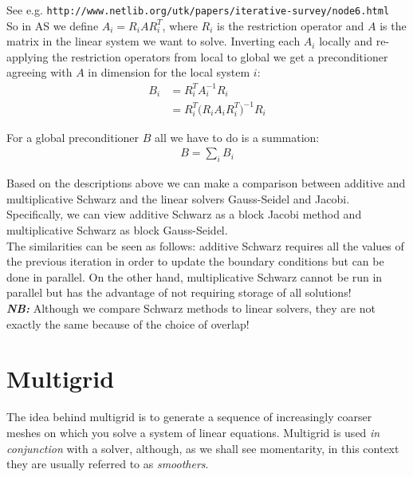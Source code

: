 See e.g. \texttt{http://www.netlib.org/utk/papers/iterative-survey/node6.html}\\

So in AS we define $A_i = R_i A R_i^T$, where $R_i$ is the restriction operator
and $A$ is the matrix in the linear system we want to solve. Inverting each $A_i$
locally and re-applying the restriction operators from local to global we get a
preconditioner agreeing with $A$ in dimension for the local system $i$:
\begin{align*}
B_i & = R_i^T A_i^{-1} R_i\\
    & = R_i^T \big(R_i A_i R_i^T \big)^{-1} R_i
\end{align*}

For a global preconditioner $B$ all we have to do is a summation:
\begin{align*}
B = \sum_i B_i
\end{align*}

\begin{remark}
Based on the descriptions above we can make a comparison between additive and multiplicative Schwarz and
the linear solvers Gauss-Seidel and Jacobi. Specifically, we can view additive Schwarz as a block Jacobi
method and multiplicative Schwarz as block Gauss-Seidel.\\
The similarities can be seen as follows: additive Schwarz requires all the values of the previous iteration
in order to update the boundary conditions but can be done in parallel. On the other hand, multiplicative
Schwarz cannot be run in parallel but has the advantage of not requiring storage of all solutions!\\

\textbf{\emph{NB:}} Although we compare Schwarz methods to linear solvers, they are not exactly the
same because of the choice of overlap!
\end{remark}

\section{Multigrid}

The idea behind multigrid is to generate a sequence of increasingly coarser meshes
on which you solve a system of linear equations. Multigrid is used \emph{in conjunction}
with a solver, although, as we shall see momentarity, in this context they are usually
referred to as \emph{smoothers}.\\

